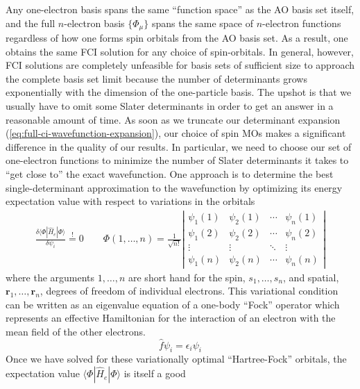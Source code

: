 Any one-electron basis spans the same ``function space'' as the AO basis set
itself, and the full $n$-electron basis $\{\Phi_\mu\}$ spans the same space of
$n$-electron functions regardless of how one forms spin orbitals from the AO
basis set.
As a result, one obtains the same FCI solution for any choice of spin-orbitals.
In general, however, FCI solutions are completely unfeasible for basis sets of
sufficient size to approach the complete basis set limit because the number of
determinants grows exponentially with the dimension of the one-particle basis.
The upshot is that we usually have to omit some Slater determinants in order to get an answer in a reasonable amount of time.
As soon as we truncate our determinant expansion
(\ref{eq:full-ci-wavefunction-expansion}), our choice of spin MOs makes a
significant difference in the quality of our results.
In particular, we need to choose our set of one-electron functions to minimize
the number of Slater determinants it takes to ``get close to'' the exact
wavefunction.
One approach is to determine the best single-determinant approximation to the
wavefunction by optimizing its energy expectation value with respect to
variations in the orbitals
\begin{align}
    \frac{\delta\langle\Phi|\hat{H}_e|\Phi\rangle}{\delta\psi_i}
    \overset{!}{=}
    0
    \qquad
    \Phi(1,\ldots,n)
    =
    \frac{1}{\sqrt{n!}}
    \left|
    \begin{matrix}
      \psi_1(1)&\psi_2(1)&\cdots&\psi_n(1)\\
      \psi_1(2)&\psi_2(2)&\cdots&\psi_n(2)\\
      \vdots    &\vdots    &\ddots&\vdots    \\
      \psi_1(n)&\psi_2(n)&\cdots&\psi_n(n)
    \end{matrix}
    \right|
\end{align}
where the arguments \(1,\ldots,n\) are short hand for the spin,
\(s_1,\ldots,s_n\), and spatial, \(\mathbf{r}_1,\ldots,\mathbf{r}_n\), degrees
of freedom of individual electrons.
This variational condition can be written as an eigenvalue equation of a
one-body ``Fock'' operator which represents an effective Hamiltonian for the
interaction of an electron with the mean field of the other electrons.
\begin{equation}
    \hat{f}
    \psi_i
    =
    \epsilon_i
    \psi_i
\end{equation}
Once we have solved for these variationally optimal ``Hartree-Fock'' orbitals,
the expectation value \(\langle\Phi|\hat{H}_e|\Phi\rangle\) is itself a good
